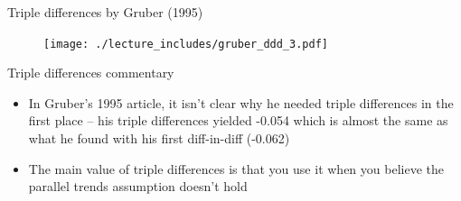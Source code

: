 \documentclass{beamer}
\begin{document}
\begin{frame}{Triple differences by Gruber (1995)}
	
	\begin{figure}
	\texttt{[image: ./lecture\_includes/gruber\_ddd\_3.pdf]}
	\end{figure}
	
\end{frame}

\begin{frame}{Triple differences commentary}

\begin{itemize}

\item In Gruber's 1995 article, it isn't clear why he needed triple differences in the first place -- his triple differences yielded -0.054 which is almost the same as what he found with his first diff-in-diff (-0.062)
\item The main value of triple differences is that you use it when you believe the parallel trends assumption doesn't hold

\end{itemize}

\end{frame}
\end{document}
